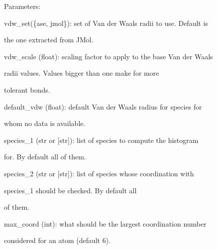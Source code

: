 \documentclass[letterpaper,10pt,english]{sphinxmanual}
\begin{document}
\begin{fulllineitems}
\begin{DUlineblock}{0em}
\item[] Parameters:
\item[]
\begin{DUlineblock}{\DUlineblockindent}
\item[] vdw\_set(\{ase, jmol\}): set of Van der Waals radii to use. Default is
\item[]
\begin{DUlineblock}{\DUlineblockindent}
\item[] the one extracted from JMol.
\end{DUlineblock}
\item[] vdw\_scale (float): scaling factor to apply to the base Van der Waals
\item[]
\begin{DUlineblock}{\DUlineblockindent}
\item[] radii values. Values bigger than one make for more
\item[] tolerant bonds.
\end{DUlineblock}
\item[] default\_vdw (float): default Van der Waals radius for species for
\item[]
\begin{DUlineblock}{\DUlineblockindent}
\item[] whom no data is available.
\end{DUlineblock}
\item[] species\_1 (str or {[}str{]}): list of species to compute the histogram
\item[]
\begin{DUlineblock}{\DUlineblockindent}
\item[] for. By default all of them.
\end{DUlineblock}
\item[] species\_2 (str or {[}str{]}): list of species whose coordination with 
\item[]
\begin{DUlineblock}{\DUlineblockindent}
\item[] species\_1 should be checked. By default all
\item[] of them.
\end{DUlineblock}
\item[] max\_coord (int): what should be the largest coordination number
\item[]
\begin{DUlineblock}{\DUlineblockindent}
\item[] considered for an atom (default 6).
\end{DUlineblock}
\end{DUlineblock}
\end{DUlineblock}


\end{fulllineitems}
\end{document}
